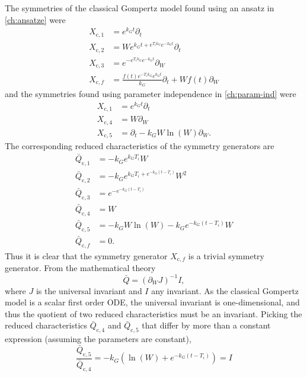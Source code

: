 The symmetries of the classical Gompertz model found using an ansatz in \cref{ch:ansatze} were
\begin{align*}
  X_{\text{c},1} &= e^{k_{G} t} \partial_t \\
  X_{\text{c},2} &= W e^{k_{G} t + e^{T_{i} k_{G}} e^{- k_{G} t}} \partial_t \\
  X_{\text{c},3} &= e^{- e^{T_{i} k_{G}} e^{- k_{G} t}} \partial_W \\
  X_{\text{c},f} &= \frac{f{\left(t \right)} e^{- T_{i} k_{G}} e^{k_{G} t}}{k_{G}} \partial_t + W f{\left(t \right)} \partial_W
\end{align*}
and the symmetries found using parameter independence in \cref{ch:param-ind} were
\begin{align*}
  X_{\text{c},1} &= e^{k_G t} \partial_t \\
  X_{\text{c},4} &= W \partial_W \\
  X_{\text{c},5} &= \partial_t - k_G W \ln\left(W\right) \partial_W.
\end{align*}
The corresponding reduced characteristics of the symmetry generators are
\begin{align*}
  \bar{Q}_{\text{c},1} &= -k_G e^{k_G T_i} W \\
  \bar{Q}_{\text{c},2} &= - k_G e^{k_{G} T_i + e^{-k_G (t - T_i)}} W^2 \\
  \bar{Q}_{\text{c},3} &= e^{- e^{- k_{G} \left(t - T_{i}\right)}} \\
  \bar{Q}_{\text{c},4} &= W \\
  \bar{Q}_{\text{c},5} &= - k_G W \ln\left(W\right) - k_G e^{-k_G (t - T_i)} W \\
  \bar{Q}_{\text{c},f} &= 0.
\end{align*}
Thus it is clear that the symmetry generator \(X_{\text{c},f}\) is a trivial symmetry generator.
From the mathematical theory
\begin{equation*}
  \bar{Q} = (\partial_W J)^{-1} I,
\end{equation*}
where \(J\) is the universal invariant and \(I\) any invariant.
As the classical Gompertz model is a scalar first order ODE, the universal invariant is one-dimensional, and thus the quotient of two reduced characteristics must be an invariant.
Picking the reduced characteristics \(\bar{Q}_{\text{c},4}\) and \(\bar{Q}_{\text{c},5}\) that differ by more than a constant expression (assuming the parameters are constant),
\begin{equation*}
  \frac{\bar{Q}_{\text{c},5}}{\bar{Q}_{\text{c},4}} = - k_G \left(\ln\left(W\right) + e^{-k_G (t - T_i)} \right) = I
\end{equation*}
